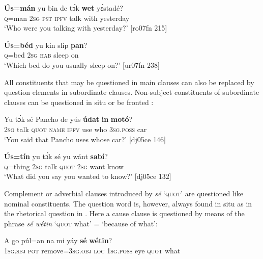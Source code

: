 \ea%
    \label{ex:key:595}
    \gll \textbf{\'{U}s=mán}  yu  bin  de  tɔ́k  \textbf{wet}    yɛ́stadé?\\
\textsc{q}=man  \textsc{2sg}  \textsc{pst}  \textsc{ipfv}  talk  with    yesterday\\

\glt ‘Who were you talking with yesterday?’ [ro07fn 215]
\z


\ea%
    \label{ex:key:596}
    \gll \textbf{\'{U}s=béd}  yu  kin  slíp    \textbf{pan}?\\
\textsc{q}=bed  \textsc{2sg}  \textsc{hab}  sleep  on\\

\glt ‘Which bed do you usually sleep on?’ [ur07fn 238]
\z

All constituents that may be questioned in main clauses can also be replaced by question elements in subordinate clauses. Non-subject constituents of subordinate clauses can be questioned in situ  or be fronted : 


\ea%
    \label{ex:key:597}
    \gll Yu  tɔ́k  sé    Pancho  de  yús  \textbf{údat}  \textbf{in}    \textbf{motó}?\\
\textsc{2sg}  talk  \textsc{quot}    \textsc{name}  \textsc{ipfv}  use  who    \textsc{3sg.poss}  car\\

\glt ‘You said that Pancho uses whose car?’ [dj05ce 146]
\z


\ea%
    \label{ex:key:598}
    \gll \textbf{\'{U}s=tín}  yu  tɔ́k  sé    yu  wánt  \textbf{sabí}?\\
\textsc{q}=thing  \textsc{2sg}  talk  \textsc{quot}    \textsc{2sg}  want  know\\

\glt ‘What did you say you wanted to know?’ [dj05ce 132]
\z

Complement or adverbial clauses introduced by \textit{sé} ‘\textsc{quot}’ are questioned like nominal constituents. The question word is, however, always found in situ as in the rhetorical question in . Here a cause clause is questioned by means of the phrase \textit{sé wétin} ‘\textsc{quot} what’ = ‘because of what’:


\ea%
    \label{ex:key:599}
    \gll A    go  púl=an      na  mi    yáy  \textbf{sé}    \textbf{wétin}?\\
\textsc{1sg.sbj}  \textsc{pot}  remove=\textsc{3sg.obj}  \textsc{loc}  \textsc{1sg.poss}  eye  \textsc{quot}    what\\

